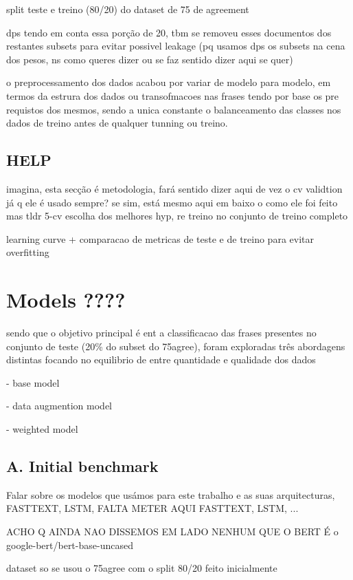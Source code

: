 \documentclass[conference]{IEEEtran}
\begin{document}
split teste e treino (80/20) do dataset de 75 de agreement

dps tendo em conta essa porção de 20, tbm se removeu esses documentos dos restantes subsets para evitar possivel leakage (pq usamos dps os subsets na cena dos pesos, ns como queres dizer ou se faz sentido dizer aqui se quer)

o preprocessamento dos dados acabou por variar de modelo para modelo, em termos da estrura dos dados ou transofmacoes nas frases tendo por base os pre requistos dos mesmos, sendo a unica constante o balanceamento das classes nos dados de treino antes de qualquer tunning ou treino.

\subsection{HELP}

imagina, esta secção é metodologia, fará sentido dizer aqui de vez o cv validtion já q ele é usado sempre? se sim, está mesmo aqui em baixo o como ele foi feito mas tldr 5-cv escolha dos melhores hyp, re treino no conjunto de treino completo

learning curve + comparacao de metricas de teste e de treino para evitar overfitting

\section{Models ????}

sendo que o objetivo principal é ent a classificacao das frases presentes no conjunto de teste (20\% do subset do 75agree), foram exploradas três abordagens distintas focando no equilibrio de entre quantidade e qualidade dos dados

- base model

- data augmention model

- weighted model

\subsection{A. Initial benchmark}

Falar sobre os modelos que usámos para este trabalho e as suas arquitecturas, FASTTEXT, LSTM, 
FALTA METER AQUI FASTTEXT, LSTM, ...

ACHO Q AINDA NAO DISSEMOS EM LADO NENHUM QUE O BERT É o google-bert/bert-base-uncased

dataset so se usou o 75agree com o split 80/20 feito inicialmente
\end{document}
